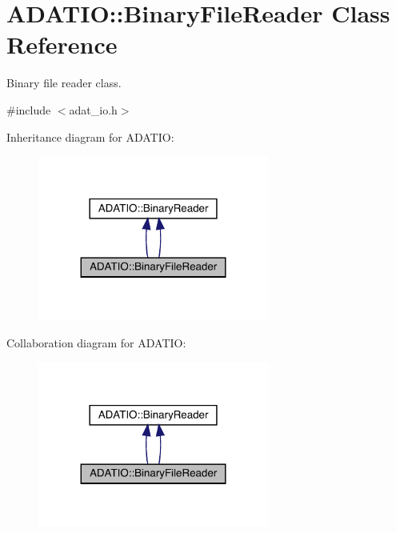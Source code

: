 \hypertarget{classADATIO_1_1BinaryFileReader}{}\section{A\+D\+A\+T\+IO\+:\+:Binary\+File\+Reader Class Reference}
\label{classADATIO_1_1BinaryFileReader}


Binary file reader class.  




{\ttfamily \#include $<$adat\+\_\+io.\+h$>$}



Inheritance diagram for A\+D\+A\+T\+IO\+:\nopagebreak
\begin{figure}[H]
\begin{center}
\leavevmode
\includegraphics[width=215pt]{d7/d01/classADATIO_1_1BinaryFileReader__inherit__graph}
\end{center}
\end{figure}


Collaboration diagram for A\+D\+A\+T\+IO\+:\nopagebreak
\begin{figure}[H]
\begin{center}
\leavevmode
\includegraphics[width=215pt]{d8/dc1/classADATIO_1_1BinaryFileReader__coll__graph}
\end{center}
\end{figure}

